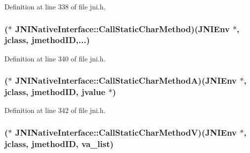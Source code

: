 Definition at line 338 of file jni.\-h.

\hypertarget{struct_j_n_i_native_interface_a04161e34d73ac210d304fad5a9cfc3a8}{
\subsubsection[{Call\-Static\-Char\-Method}]{($\ast$ J\-N\-I\-Native\-Interface\-::\-Call\-Static\-Char\-Method)({\bf J\-N\-I\-Env} $\ast$, {\bf jclass}, {\bf jmethod\-I\-D},...)}}\label{struct_j_n_i_native_interface_a04161e34d73ac210d304fad5a9cfc3a8}


Definition at line 340 of file jni.\-h.

\hypertarget{struct_j_n_i_native_interface_a8735c5573a435bc703da4e819a64a204}{
\subsubsection[{Call\-Static\-Char\-Method\-A}]{($\ast$ J\-N\-I\-Native\-Interface\-::\-Call\-Static\-Char\-Method\-A)({\bf J\-N\-I\-Env} $\ast$, {\bf jclass}, {\bf jmethod\-I\-D}, {\bf jvalue} $\ast$)}}\label{struct_j_n_i_native_interface_a8735c5573a435bc703da4e819a64a204}


Definition at line 342 of file jni.\-h.

\hypertarget{struct_j_n_i_native_interface_a0d6871d4af3b57da61554717e0ee90cc}{
\subsubsection[{Call\-Static\-Char\-Method\-V}]{($\ast$ J\-N\-I\-Native\-Interface\-::\-Call\-Static\-Char\-Method\-V)({\bf J\-N\-I\-Env} $\ast$, {\bf jclass}, {\bf jmethod\-I\-D}, va\-\_\-list)}}\label{struct_j_n_i_native_interface_a0d6871d4af3b57da61554717e0ee90cc}


